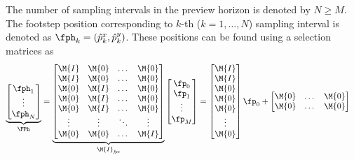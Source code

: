 The number of sampling intervals in the preview horizon is denoted by $N \ge
M$. The footstep position corresponding to $k$-th ($k = 1,\dots,N$) sampling
interval is denoted as $\fph_k = (\hat{p}^x_k, \hat{p}^y_k)$. These positions
can be found using a selection matrices as
%
\begin{equation}
\begin{split}
    \underbrace{
    \begin{bmatrix}
        \fph_1 \\
        \vdots \\
        \fph_N
    \end{bmatrix}
    }_{\FPh}
    & =
    \underbrace{
    \begin{bmatrix}
        \M{I}   &  \M{0}   &   \dots   &   \M{0} \\
        \M{I}   &  \M{0}   &   \dots   &   \M{0} \\
        \M{0}   &  \M{I}   &   \dots   &   \M{0} \\
        \M{0}   &  \M{I}   &   \dots   &   \M{0} \\
        \M{0}   &  \M{I}   &   \dots   &   \M{0} \\
        \vdots  &  \vdots  &   \ddots  &   \vdots \\
        \M{0}   &  \M{0}   &   \dots   &   \M{I} \\
    \end{bmatrix}
    }_{\M{I}_{\mathit{fps}}}
    \begin{bmatrix}
        \fp_0 \\
        \fp_1 \\
        \vdots\\
        \fp_M \\
    \end{bmatrix}
    =
    \begin{bmatrix}
        \M{I}   \\
        \M{I}   \\
        \M{0}   \\
        \M{0}   \\
        \M{0}   \\
        \vdots  \\
        \M{0}   \\
    \end{bmatrix}
    \fp_0
    +
    \begin{bmatrix}
        \M{0}   &   \dots   &   \M{0} \\
        \M{0}   &   \dots   &   \M{0} \\

\end{bmatrix}
\end{split}
\end{equation}
